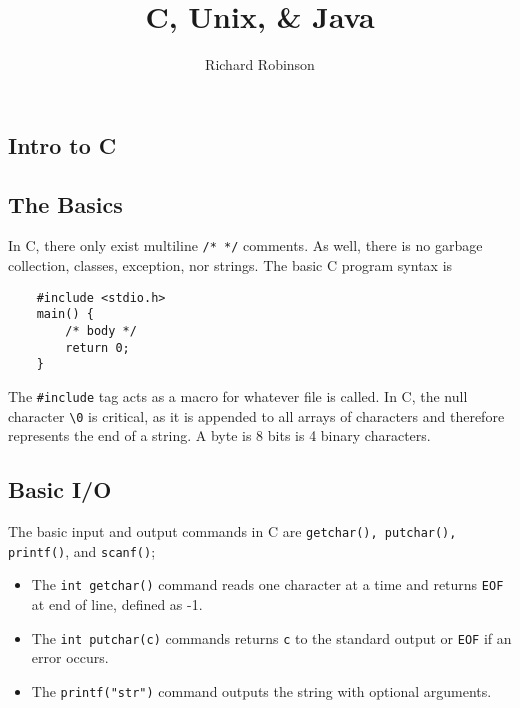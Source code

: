 \documentclass{tufte-book}
\title{C, Unix, \& Java}
\author{Richard Robinson}
\begin{document}
\maketitle
\setlength{\parindent}{0pt}
\begin{fullwidth}

\chapter{Intro to C}

\section{The Basics}
In C, there only exist multiline \lstinline{/* */} comments. As well, there is no garbage collection, classes, exception, nor strings. The basic C program syntax is
\begin{lstlisting}
    #include <stdio.h>
    main() {
        /* body */
        return 0;
    }
\end{lstlisting}
The \lstinline{#include} tag acts as a macro for whatever file is called. In C, the null character \lstinline{\0} is critical, as it is appended to all arrays of characters and therefore represents the end of a string. A byte is 8 bits is 4 binary characters.

\section{Basic I/O}
The basic input and output commands in C are \lstinline{getchar(), putchar(), printf()}, and \lstinline{scanf()};
\begin{itemize}
    \item The \lstinline{int getchar()} command reads one character at a time and returns \lstinline{EOF} at end of line, defined as -1.

    \item The \lstinline{int putchar(c)} commands returns \lstinline{c} to the standard output or \lstinline{EOF} if an error occurs.

    \item The \lstinline{printf("str")} command outputs the string with optional arguments.


\end{itemize}
\end{fullwidth}
\end{document}
